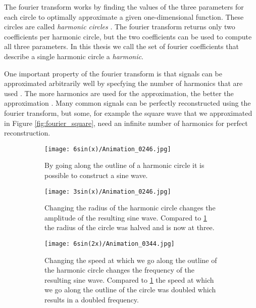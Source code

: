 \documentclass[thesis.tex]{subfiles}
\begin{document}
The fourier transform works by finding the values of the three parameters for each circle to optimally approximate a given one-dimensional function. These circles are called \textit{harmonic circles} \cite{snvastava2006nurbs}. The fourier transform returns only two coefficients per harmonic circle, but the two coefficients can be used to compute all three parameters. In this thesis we call the set of fourier coefficients that describe a single harmonic circle a \textit{harmonic}. 

One important property of the fourier transform is that signals can be approximated arbitrarily well by specfying the number of harmonics that are used \cite{nixon2012feature}. The more harmonics are used for the approximation, the better the approximation \cite{nixon2012feature}. Many common signals can be perfectly reconstructed using the fourier transform, but some, for example the square wave that we approximated in Figure \ref{fig:fourier_square}, need an infinite number of harmonics for perfect reconstruction.

\begin{figure}
\centering
	\begin{subfigure}{\textwidth}
		\centering
		\texttt{[image: 6sin(x)/Animation\_0246.jpg]}
		\caption{By going along the outline of a harmonic circle it is possible to construct a sine wave.}\label{fig:fourier}		
	\end{subfigure}
	\begin{subfigure}[t]{\textwidth}
		\centering
		\texttt{[image: 3sin(x)/Animation\_0246.jpg]}
		\caption{Changing the radius of the harmonic circle changes the amplitude of the resulting sine wave. Compared to \ref{fig:fourier} the radius of the circle was halved and is now at three.}\label{fig:fourier_radius}		
	\end{subfigure}
	\begin{subfigure}[t]{\textwidth}
		\centering
		\texttt{[image: 6sin(2x)/Animation\_0344.jpg]}
		\caption{Changing the speed at which we go along the outline of the harmonic circle changes the frequency of the resulting sine wave. Compared to \ref{fig:fourier} the speed at which we go along the outline of the circle was doubled which results in a doubled frequency.}\label{fig:fourier_speed}		
	\end{subfigure}
	\caption{}
\end{figure}
 \smallskip
\end{document}
